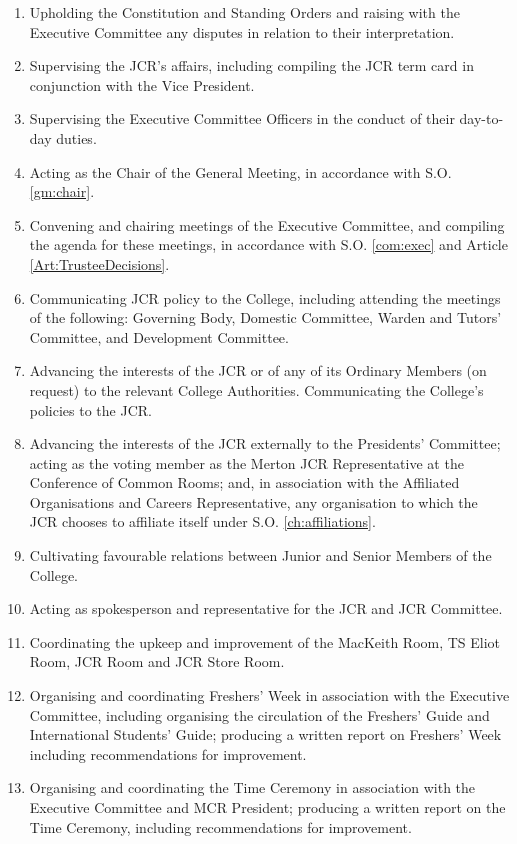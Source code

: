 \begin{enumerate}
	\item Upholding the Constitution and Standing Orders and raising with the Executive Committee any disputes in relation to their interpretation.
	\item Supervising the JCR's affairs, including compiling the JCR term card in conjunction with the Vice President.     
	\item Supervising the Executive Committee Officers in the conduct of their day-to-day duties.
	\item Acting as the Chair of the General Meeting, in accordance with S.O. \ref{gm:chair}.     
	\item Convening and chairing meetings of the Executive Committee, and compiling the agenda for these meetings, in accordance with S.O. \ref{com:exec} and Article \ref{Art:TrusteeDecisions}.
	\item Communicating JCR policy to the College, including attending the meetings of the following: Governing Body, Domestic Committee, Warden and Tutors' Committee, and Development Committee.
	\item Advancing the interests of the JCR or of any of its Ordinary Members (on request) to the relevant College Authorities.
	Communicating the College's policies to the JCR.     
	\item Advancing the interests of the JCR externally to the Presidents' Committee; acting as the voting member as the Merton JCR Representative at the Conference of Common Rooms; and, in association with the Affiliated Organisations and Careers Representative, any organisation to which the JCR chooses to affiliate itself under S.O. \ref{ch:affiliations}.
	\item Cultivating favourable relations between Junior and Senior Members of the College.
	\item Acting as spokesperson and representative for the JCR and JCR Committee.
	\item Coordinating the upkeep and improvement of the MacKeith Room, TS Eliot Room, JCR Room and JCR Store Room.
	\item Organising and coordinating Freshers' Week in association with the Executive Committee, including organising the circulation of the Freshers' Guide and International Students' Guide; producing a written report on Freshers' Week including recommendations for improvement.
	\item Organising and coordinating the Time Ceremony in association with the Executive Committee and MCR President; producing a written report on the Time Ceremony, including recommendations for improvement.

\end{enumerate}
